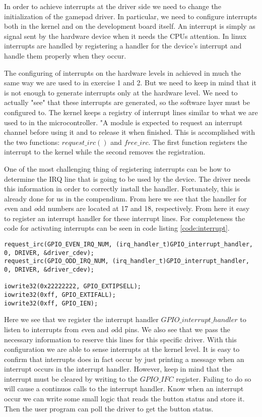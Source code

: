 In order to achieve interrupts at the driver side we need to change the initialization of the gamepad driver. In particular, we need to configure interrupts both in the kernel and on the development board itself. An interrupt is simply as signal sent by the hardware device when it needs the CPUs attention. In linux interrupts are handled by registering a handler for the device's interrupt and handle them properly when they occur. 

The configuring of interrupts on the hardware levels in achieved in much the same way we are used to 
in exercise 1 and 2. But we need to keep in mind that it is not enough to generate interrupts only at the hardware level. We need to actually "see" that these interrupts are generated, so the software layer must be configured to. The kernel keeps a registry of interrupt lines similar to what we are used to in the microcontroller. "A module is expected to request an interrupt channel before using it and to release it when finished. This is accomplished with the two functions: $request\_irc()$ and $free\_irc$. The first function registers the interrupt to the kernel while the second removes the registration. 

One of the most challenging thing of registering interrupts can be how to determine the IRQ line that is going to be used by the device. The driver needs this information in order to correctly install the handler. Fortunately, this is already done for us in the compendium. From here we see that the handler for {\emph even} and {\emph odd} numbers are located at 17 and 18, respectively. From here it easy to register an interrupt handler for these interrupt lines. For completeness the code for activating interrupts can be seen in code listing \ref{code:interrupt}.

\begin{lstlisting}[caption=Activate interupts, label=code:interrupt]
request_irc(GPIO_EVEN_IRQ_NUM, (irq_handler_t)GPIO_interrupt_handler, 0, DRIVER, &driver_cdev);
request_irc(GPIO_ODD_IRQ_NUM, (irq_handler_t)GPIO_interrupt_handler, 0, DRIVER, &driver_cdev);

iowrite32(0x22222222, GPIO_EXTIPSELL);
iowrite32(0xff, GPIO_EXTIFALL);
iowrite32(0xff, GPIO_IEN);
\end{lstlisting}






Here we see that we register the interrupt handler $GPIO\_interrupt\_handler$ to listen to interrupts from {\emph even} and {\emph odd} pins. We also see that we pass the necessary information to reserve this lines for this specific driver. With this configuration we are able to sense interrupts at the kernel level. It is easy to confirm that interrupts does in fact occur by just printing a message when an interrupt occurs in the interrupt handler. However, keep in mind that the interrupt must be cleared by writing to the $GPIO\_IFC$ register. Failing to do so will cause a continuos calls to the interrupt handler. Know when an interrupt occur we can write some small logic that reads the button status and store it. Then the user program can poll the driver to get the button status. 


